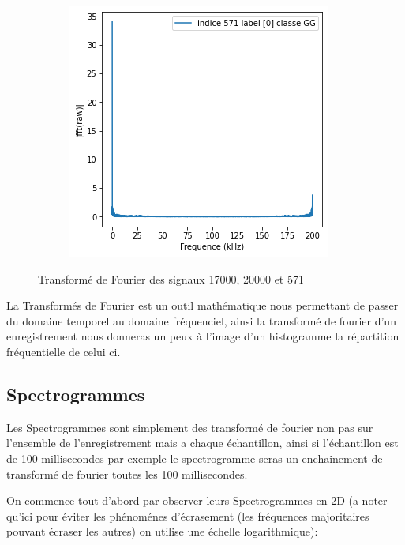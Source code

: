 \begin{figure}[!h]
\begin{subfigure}[b]{0.3\textwidth}
  \end{subfigure}
  \begin{subfigure}[b]{0.3\textwidth}
    \includegraphics[width=\textwidth]{./images/571fft.png}
  \end{subfigure}
\caption{Transformé de Fourier des signaux 17000, 20000 et 571}
\end{figure}

La Transformés de Fourier est un outil mathématique nous permettant de passer du domaine temporel au domaine fréquenciel, ainsi la transformé de fourier d'un enregistrement nous donneras un peux à l'image d'un histogramme la répartition fréquentielle de celui ci.

\hypertarget{Spectrogrammes}{%
\subsection{Spectrogrammes}
\label{Spectrogrammes}}

Les Spectrogrammes sont simplement des transformé de fourier non pas sur l'ensemble de l'enregistrement mais a chaque échantillon, ainsi si l'échantillon est de 100 millisecondes par exemple le spectrogramme seras un enchainement de transformé de fourier toutes les 100 millisecondes.

On commence tout d'abord par observer leurs Spectrogrammes en 2D (a noter qu'ici pour éviter les phénoménes d'écrasement (les fréquences majoritaires pouvant écraser les autres) on utilise une échelle logarithmique):

